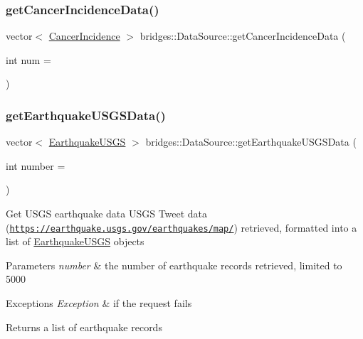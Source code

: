 \subsubsection{\texorpdfstring{get\+Cancer\+Incidence\+Data()}{getCancerIncidenceData()}}
{\footnotesize\ttfamily vector$<$ \mbox{\hyperlink{classbridges_1_1_cancer_incidence}{Cancer\+Incidence}} $>$ bridges\+::\+Data\+Source\+::get\+Cancer\+Incidence\+Data (\begin{DoxyParamCaption}\item[{int}]{num = {} }\end{DoxyParamCaption})}

\mbox{\label{namespacebridges_1_1_data_source_ae9f6a40dae8b8a15ebe43aca34931b43}} 
\subsubsection{\texorpdfstring{get\+Earthquake\+U\+S\+G\+S\+Data()}{getEarthquakeUSGSData()}}
{\footnotesize\ttfamily vector$<$ \mbox{\hyperlink{classbridges_1_1_earthquake_u_s_g_s}{Earthquake\+U\+S\+GS}} $>$ bridges\+::\+Data\+Source\+::get\+Earthquake\+U\+S\+G\+S\+Data (\begin{DoxyParamCaption}\item[{int}]{number = {} }\end{DoxyParamCaption})}

Get U\+S\+GS earthquake data U\+S\+GS Tweet data (\href{https://earthquake.usgs.gov/earthquakes/map/}{\tt https\+://earthquake.\+usgs.\+gov/earthquakes/map/}) retrieved, formatted into a list of \mbox{\hyperlink{classbridges_1_1_earthquake_u_s_g_s}{Earthquake\+U\+S\+GS}} objects


\begin{DoxyParams}{Parameters}
{\em number} & the number of earthquake records retrieved, limited to 5000 \\
\hline
\end{DoxyParams}

\begin{DoxyExceptions}{Exceptions}
{\em Exception} & if the request fails\\
\hline
\end{DoxyExceptions}
\begin{DoxyReturn}{Returns}
a list of earthquake records 
\end{DoxyReturn}
\mbox{\label{namespacebridges_1_1_data_source_a96a28cc7f2a6013fe09b07cc53c7432f}} 
